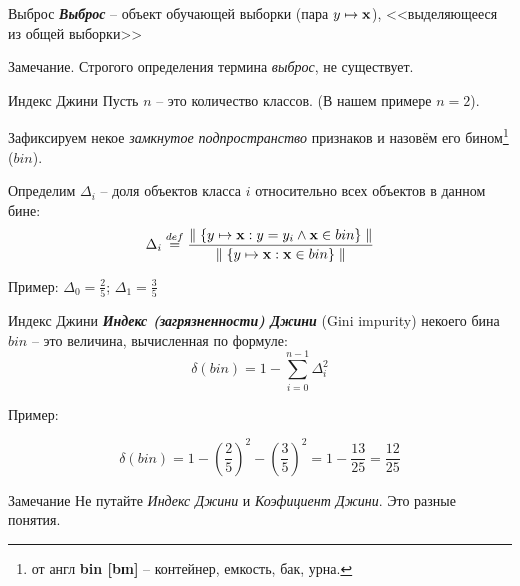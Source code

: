 \documentclass{beamer}
\newcommand{\termdef}[1]{\textbf{\textit{#1}}}
\newcommand{\term}{\textit}
\begin{document}
\begin{frame}{Выброс}
	\termdef{Выброс} -- объект обучающей выборки (пара $y \mapsto \bold x$),
	<<выделяющееся из общей выборки>>
	\begin{center}
	\begin{tikzpicture}[scale=1.5]
	
	\end{tikzpicture}
	\end{center}

	\begin{block}{Замечание.}
	Строгого определения термина \term{выброс}, не существует.
	\end{block}
\end{frame}

\begin{frame}{Индекс Джини}
	\small
	Пусть $n$ -- это количество классов. 
	(В нашем примере $n=2$).
	
	Зафиксируем некое \term{замкнутое подпространство} признаков и назовём его 
	бином\footnote{от англ \textbf{bin [bɪn]} -- контейнер, емкость, бак, урна.}
	($bin$).
	
	Определим $\Delta_i$ -- доля объектов класса $i$ относительно всех объектов в данном бине:
	\begin{equation}
	\Delta_i \stackrel{def}{=} \frac{ \parallel \{y \mapsto \bold x : y = y_i \wedge \bold x \in bin \} \parallel}
	{
	\parallel \{y \mapsto \bold x :  \bold x \in bin \} \parallel
	}
	\end{equation}	
	\begin{center}  
	\begin{tikzpicture}[scale=1.5]
	
	\end{tikzpicture} 
	Пример:
	$\Delta_0 = \frac{2}{5}$; 
	$\Delta_1 = \frac{3}{5}$
	\end{center}

\end{frame}

\begin{frame}{Индекс Джини}
	\small
	\termdef{Индекс (загрязненности) Джини} (Gini impurity) 
	некоего бина $bin$ -- это величина, вычисленная по формуле:
	\begin{equation}
	\delta (bin)= 1 - \sum_{i=0}^{n-1} \Delta_i ^ 2
	\end{equation}
	
	
	\begin{center}
	Пример:
	\begin{tikzpicture}[scale=1.5]
	
	\end{tikzpicture} 
	\end{center}
	
	\begin{equation*}
	\delta (bin) = 1 - \left( \frac{2}{5}\right)^2 - \left( \frac{3}{5}\right)^2 = 
	1 - \frac{13}{25} = \frac{12}{25} 
	\end{equation*}
	
	
	\begin{block}{Замечание}
	Не путайте \term{Индекс Джини} и 
	\term{Коэфициент Джини}. Это разные понятия.
	\end{block}
\end{frame}
\end{document}
